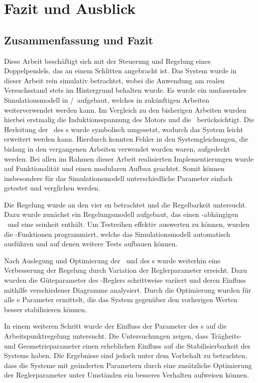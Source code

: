 \chapter{Fazit und Ausblick}

\section{Zusammenfassung und Fazit}

Diese Arbeit beschäftigt sich mit der Steuerung und Regelung eines Doppelpendels, das an einem Schlitten angebracht ist.
Das System wurde in dieser Arbeit rein simulativ betrachtet, wobei die Anwendung am realen Versuchsstand stets im Hintergrund behalten wurde.
Es wurde ein umfassendes Simulationsmodell in \ml/\sm\ aufgebaut, welches in zukünftigen Arbeiten weiterverwendet werden kann. Im Vergleich zu den bisherigen Arbeiten wurden hierbei erstmalig die Induktionsspannung des Motors und die \crb\ berücksichtigt.
Die Herleitung der \bwgl\ des \spds s wurde symbolisch umgesetzt, wodurch das System leicht erweitert werden kann.
Hierdurch konnten Fehler in den Systemgleichungen, die bislang in den vergangenen Arbeiten verwendet worden waren, aufgedeckt werden.
Bei allen im Rahmen dieser Arbeit realisierten Implementierungen wurde auf Funktionalität und einen modularen Aufbau geachtet.
Somit können insbesondere für das Simulationsmodell unterschiedliche Parameter einfach getestet und verglichen werden.

Die Regelung wurde an den vier \ap en betrachtet und die Regelbarkeit untersucht.
Dazu wurde zunächst ein Regelungsmodell aufgebaut, das einen \ap-abhängigen \zsr\ und eine \vorst seinheit enthält.
Um Testreihen effektiv auswerten zu können, wurden die \xots-Funktionen programmiert, welche das Simulationsmodell automatisch ausführen und auf denen weitere Tests aufbauen können.

Nach Auslegung und Optimierung der \vorst\ und des \beob s wurde weiterhin eine Verbesserung der Regelung durch Variation der Reglerparameter erreicht.
Dazu wurden die Güteparameter des \ricc-Reglers schrittweise variiert und deren Einfluss mithilfe verschiedener Diagramme analysiert.
Durch die Optimierung wurden für alle \ap e Parameter ermittelt, die das System gegenüber den vorherigen Werten besser stabilisieren können.

In einem weiteren Schritt wurde der Einfluss der Parameter des \dpd s auf die Arbeitspunktregelung untersucht.
Die Untersuchungen zeigen, dass Trägheits- und Geometrieparameter einen erheblichen Einfluss auf die Stabilisierbarkeit des Systems haben.
Die Ergebnisse sind jedoch unter dem Vorbehalt zu betrachten, dass die Systeme mit geänderten Parametern durch eine zusätzliche Optimierung der Reglerparameter unter Umständen ein besseres Verhalten aufweisen können. 

